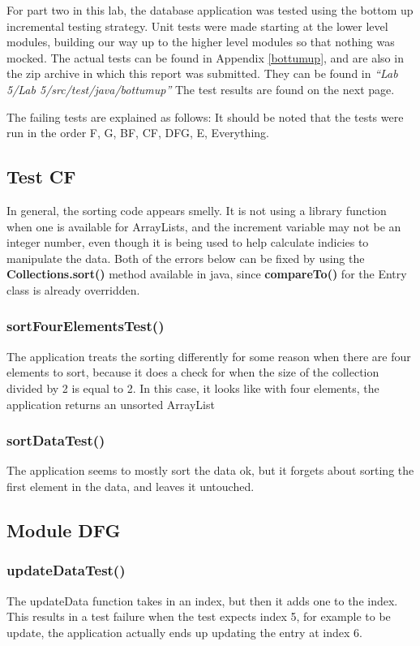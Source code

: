 For part two in this lab, the database application was tested using the bottom
up incremental testing strategy. Unit tests were made starting at the lower
level modules, building our way up to the higher level modules so that nothing
was mocked. The
actual tests can be found in Appendix \ref{bottumup}, and are also in the zip
archive in which this report was submitted. They can be found in
\emph{``Lab 5/Lab 5/src/test/java/bottumup''} The test results are found on the
next page.
%


The failing tests are explained as follows:
It should be noted that the tests were run in the order F, G, BF, CF, DFG, E,
Everything.
\subsection{Test CF}
In general, the sorting code appears smelly. It is not using a library function
when one is available for ArrayLists, and the increment variable may not be an
integer number, even though it is being used to help calculate indicies to
manipulate the data. Both of the errors below can be fixed by using the
\textbf{Collections.sort()} method available in java, since \textbf{compareTo()}
for the Entry class is already overridden.
\subsubsection{sortFourElementsTest()}
The application treats the sorting differently for some reason when there are
four elements to sort, because it does a check for when the size of the
collection divided by 2 is equal to 2. In this case, it looks like with four
elements, the application returns an unsorted ArrayList

\subsubsection{sortDataTest()}
The application seems to mostly sort the data ok, but it forgets about sorting
the first element in the data, and leaves it untouched.

\subsection{Module DFG}
\subsubsection{updateDataTest()}
The updateData function takes in an index, but then it adds one to the index.
This results in a test failure when the test expects index 5, for example to be
update, the application actually ends up updating the entry at index 6.


